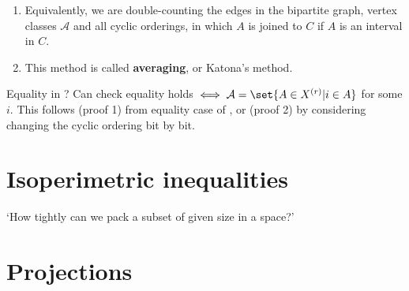 \documentclass{article}
\newcommand{\A}{\mathcal{A}}
\newcommand{\named}[1]{\textbf{#1}\index{#1}}
\begin{document}
\begin{remark}\leavevmode
  \begin{enumerate}
    \item Equivalently, we are double-counting the edges in the bipartite graph, vertex classes $\A$ and all cyclic orderings, in which $A$ is joined to $C$ if $A$ is an interval in $C$.
    \item This method is called \named{averaging}, or Katona's method.
  \end{enumerate}
\end{remark}
Equality in ? Can check equality holds $\iff \A = \set{A \in X^{(r)} | i \in A}$ for some $i$.
This follows (proof 1) from equality case of , or (proof 2) by considering changing the cyclic ordering bit by bit.
\clearpage
\section{Isoperimetric inequalities}
`How tightly can we pack a subset of given size in a space?'
\clearpage
\section{Projections}
\printindex
\end{document}
